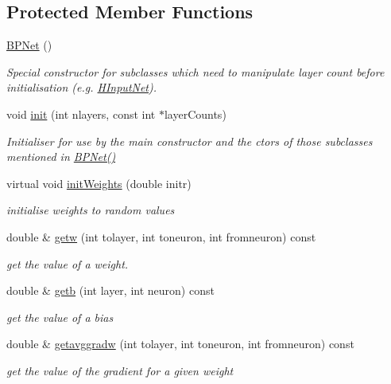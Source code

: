 \subsection*{Protected Member Functions}
\begin{DoxyCompactItemize}
\item 
\hyperlink{classBPNet_ad9b8ec22ef6319ebda7b3ac996b76f3e}{B\+P\+Net} ()
\begin{DoxyCompactList}\small\item\em Special constructor for subclasses which need to manipulate layer count before initialisation (e.\+g. \hyperlink{classHInputNet}{H\+Input\+Net}). \end{DoxyCompactList}\item 
void \hyperlink{classBPNet_ada480f784f72fb5de132ce368adde531}{init} (int nlayers, const int $\ast$layer\+Counts)
\begin{DoxyCompactList}\small\item\em Initialiser for use by the main constructor and the ctors of those subclasses mentioned in \hyperlink{classBPNet_ad9b8ec22ef6319ebda7b3ac996b76f3e}{B\+P\+Net()} \end{DoxyCompactList}\item 
virtual void \hyperlink{classBPNet_ae1b90b3c92f6be9af29005371da66543}{init\+Weights} (double initr)
\begin{DoxyCompactList}\small\item\em initialise weights to random values \end{DoxyCompactList}\item 
double \& \hyperlink{classBPNet_a20f1696c6c5449b79101dc4f345e599e}{getw} (int tolayer, int toneuron, int fromneuron) const 
\begin{DoxyCompactList}\small\item\em get the value of a weight. \end{DoxyCompactList}\item 
double \& \hyperlink{classBPNet_a1ffbe006ab858291ec96c503696c3131}{getb} (int layer, int neuron) const 
\begin{DoxyCompactList}\small\item\em get the value of a bias \end{DoxyCompactList}\item 
double \& \hyperlink{classBPNet_a48d88671bda131e1a6d0baab080b6df6}{getavggradw} (int tolayer, int toneuron, int fromneuron) const 
\begin{DoxyCompactList}\small\item\em get the value of the gradient for a given weight \end{DoxyCompactList}\item 

\end{DoxyCompactItemize}
